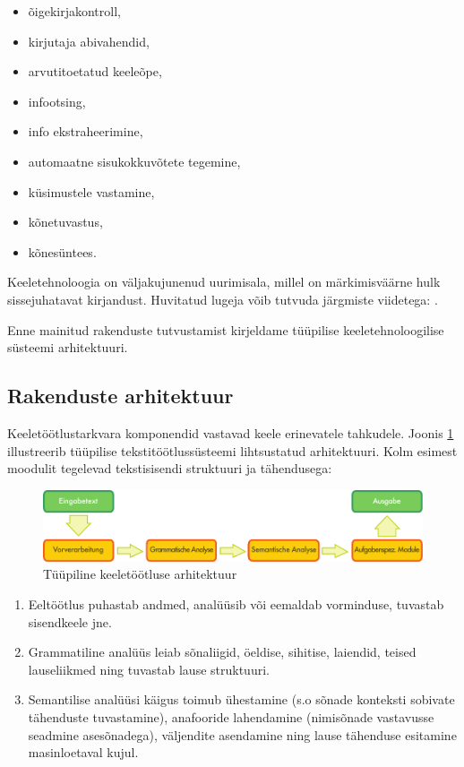 \begin{multicols}{2}
       \begin{itemize}
      \item õigekirjakontroll,
      \item kirjutaja abivahendid,
      \item arvutitoetatud keeleõpe,
      \item infootsing,
      \item info ekstraheerimine,
      \item automaatne sisukokkuvõtete tege\-mine,
      \item küsimustele vastamine,
      \item kõnetuvastus,
      \item kõnesüntees.
    \end{itemize}


Keeletehnoloogia on väljakujunenud uurimisala, millel on märkimisväärne hulk sissejuhatavat kirjandust. Huvitatud lugeja võib tutvuda järgmiste viidetega:  \cite{carstensen-etal1, jurafsky-martin01, manning-schuetze1, lt-world1, lt-survey1}.

Enne mainitud rakenduste tutvustamist kirjeldame tüüpilise keeletehnoloogilise süsteemi arhitektuuri. 


\subsection{Rakenduste arhitektuur}

Keeletöötlustarkvara komponendid vastavad keele erinevatele tahkudele. 
Joonis \ref{fig:textprocessingarch_ee} illustreerib tüüpilise tekstitöötlussüsteemi lihtsustatud arhitektuuri. 
Kolm esimest moodulit tegelevad tekstisisendi struktuuri ja tähendusega:

\begin{figure}[htb]
  \center
  \includegraphics[width=\textwidth]{../_media/german/text_processing_app_architecture}
  \caption{Tüüpiline keeletöötluse arhitektuur}
  \label{fig:textprocessingarch_ee}
\end{figure}

\begin{enumerate}
      \item Eeltöötlus puhastab andmed, ana\-lüüsib või eemaldab vorminduse, tuvastab sisendkeele  jne.
      \item Grammatiline analüüs leiab sõna\-liigid, öeldise, sihitise, laiendid, teised lauseliikmed ning tuvastab lause struktuuri.
      \item Semantilise analüüsi käigus toimub ühestamine (s.o sõnade konteksti sobivate tähenduste tuvastamine), anafooride lahendamine (nimisõnade vastavusse seadmine asesõnadega), väljendite asendamine ning lause tähenduse esitamine masinloetaval kujul.
\end{enumerate}


\end{multicols}
